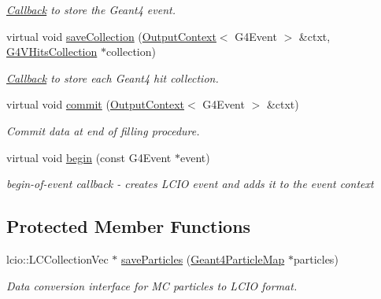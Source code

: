 \begin{DoxyCompactItemize}
\begin{DoxyCompactList}\small\item\em \hyperlink{class_d_d4hep_1_1_callback}{Callback} to store the Geant4 event. \end{DoxyCompactList}\item 
virtual void \hyperlink{class_d_d4hep_1_1_simulation_1_1_geant4_output2_l_c_i_o_aeba8f94323098614ee901a3ff0642c73}{save\+Collection} (\hyperlink{class_d_d4hep_1_1_simulation_1_1_geant4_output_action_1_1_output_context}{Output\+Context}$<$ G4\+Event $>$ \&ctxt, \hyperlink{class_g4_v_hits_collection}{G4\+V\+Hits\+Collection} $\ast$collection)
\begin{DoxyCompactList}\small\item\em \hyperlink{class_d_d4hep_1_1_callback}{Callback} to store each Geant4 hit collection. \end{DoxyCompactList}\item 
virtual void \hyperlink{class_d_d4hep_1_1_simulation_1_1_geant4_output2_l_c_i_o_a86575064911453b387f237077fa8a969}{commit} (\hyperlink{class_d_d4hep_1_1_simulation_1_1_geant4_output_action_1_1_output_context}{Output\+Context}$<$ G4\+Event $>$ \&ctxt)
\begin{DoxyCompactList}\small\item\em Commit data at end of filling procedure. \end{DoxyCompactList}\item 
virtual void \hyperlink{class_d_d4hep_1_1_simulation_1_1_geant4_output2_l_c_i_o_a36b7ecdf04169c4597bae18e021b60ea}{begin} (const G4\+Event $\ast$event)
\begin{DoxyCompactList}\small\item\em begin-\/of-\/event callback -\/ creates L\+C\+IO event and adds it to the event context \end{DoxyCompactList}\end{DoxyCompactItemize}
\subsection*{Protected Member Functions}
\begin{DoxyCompactItemize}
\item 
lcio\+::\+L\+C\+Collection\+Vec $\ast$ \hyperlink{class_d_d4hep_1_1_simulation_1_1_geant4_output2_l_c_i_o_a8c72e4dba5f1d6d5e38ea206e988d418}{save\+Particles} (\hyperlink{class_d_d4hep_1_1_simulation_1_1_geant4_particle_map}{Geant4\+Particle\+Map} $\ast$particles)
\begin{DoxyCompactList}\small\item\em Data conversion interface for MC particles to L\+C\+IO format. \end{DoxyCompactList}\end{DoxyCompactItemize}
